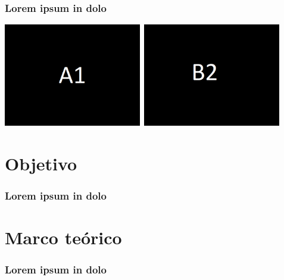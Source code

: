 \documentclass[aspectratio=169, xcolor=table]{beamer}
\begin{document}
\begin{frame}\frametitle{Lorem ipsum in dolo}
  
  \lipsum[1][2]
  
  \begin{center}
    \includegraphics[width=0.45\textwidth]{./img/a1.png}\
    \includegraphics[width=0.45\textwidth]{./img/b2.png}
  \end{center}
\end{frame}

\section{Objetivo}
\begin{frame}\frametitle{Lorem ipsum in dolo}
  \lipsum[1][1-3]
\end{frame}

\section{Marco teórico}
\begin{frame}\frametitle{Lorem ipsum in dolo}
  \lipsum[1][1-3]
\end{frame}
\end{document}
